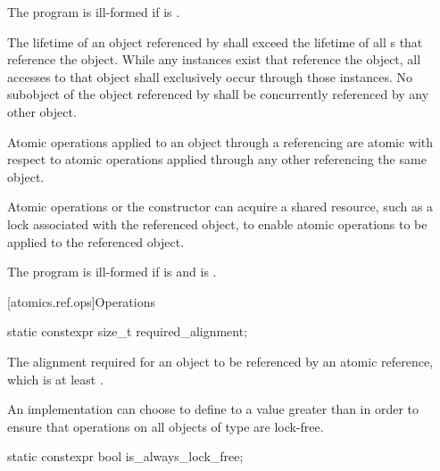 \pnum
The program is ill-formed if  is .

\pnum
The lifetime of an object referenced by 
shall exceed the lifetime of all s that reference the object.
While any  instances exist
that reference the  object,
all accesses to that object shall exclusively occur
through those  instances.
No subobject of the object referenced by 
shall be concurrently referenced by any other  object.

\pnum
Atomic operations applied to an object
through a referencing  are atomic with respect to
atomic operations applied through any other 
referencing the same object.
\begin{note}
Atomic operations or the  constructor can acquire
a shared resource, such as a lock associated with the referenced object,
to enable atomic operations to be applied to the referenced object.
\end{note}

\pnum
The program is ill-formed
if  is  and
 is .

[atomics.ref.ops]{Operations}

%
%
%
%
\begin{itemdecl}
static constexpr size_t required_alignment;
\end{itemdecl}

\begin{itemdescr}
\pnum
The alignment required for an object to be referenced by an atomic reference,
which is at least .

\pnum
\begin{note}
An implementation can choose to define
to a value greater than  in order to ensure that
operations on all objects of type  are lock-free.
\end{note}
\end{itemdescr}

%
%
%
%
\begin{itemdecl}
static constexpr bool is_always_lock_free;
\end{itemdecl}

